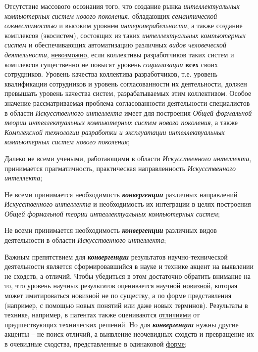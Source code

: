 \begin{textitemize}
	\item
	Отсутствие массового осознания того, что создание рынка \textit{интеллектуальных компьютерных систем нового поколения}, обладающих \textit{семантической совместимостью} и высоким уровнем \textit{интероперабельности}, а также создание комплексов (экосистем), состоящих из таких \textit{интеллектуальных компьютерных систем} и обеспечивающих автоматизацию различных \textit{видов человеческой деятельности}, \underline{невозможно}, если коллективы разработчиков таких систем и комплексов существенно не повысят уровень \textit{социализации} \textbf{всех} своих сотрудников. Уровень качества коллектива разработчиков, т.е. уровень квалификации сотрудников и уровень согласованности их деятельности, должен превышать уровень качества систем, разрабатываемых этим коллективом. Особое значение рассматриваемая проблема согласованности деятельности специалистов в области \textit{Искусственного интеллекта} имеет для построения \textit{Общей формальной теории интеллектуальных компьютерных систем нового поколения}, а также \textit{Комплексной технологии разработки и эксплуатации интеллектуальных компьютерных систем нового поколения};
	\item
	Далеко не всеми учеными, работающими в области \textit{Искусственного интеллекта}, принимается прагматичность, практическая направленность \textit{Искусственного интеллекта};
	\item
	Не всеми принимается необходимость \textbf{\textit{конвергенции}} различных направлений \textit{Искусственного интеллекта} и необходимость их интеграции в целях построения \textit{Общей формальной теории интеллектуальных компьютерных систем};
	\item
	Не всеми принимается необходимость \textbf{\textit{конвергенции}} различных видов деятельности в области \textit{Искусственного интеллекта};
	\item
	Важным препятствием для \textbf{\textit{конвергенции}} результатов научно-технической деятельности является сформировавшийся в науке и технике акцент на выявлении не сходств, а отличий. Чтобы убедиться в этом достаточно обратить внимание на то, что уровень научных результатов оценивается научной \underline{новизной}, которая может имитироваться новизной не по существу, а по форме представления (например, с помощью новых понятий или даже новых терминов). Результаты в технике, например, в патентах также оцениваются \underline{отличиями} от предшествующих технических решений. Но для \textbf{\textit{конвергенции}} нужны другие акценты -- не поиск отличий, а выявление неочевидных сходств и превращение их в очевидные сходства, представленные в одинаковой \underline{форме};

\end{textitemize}
